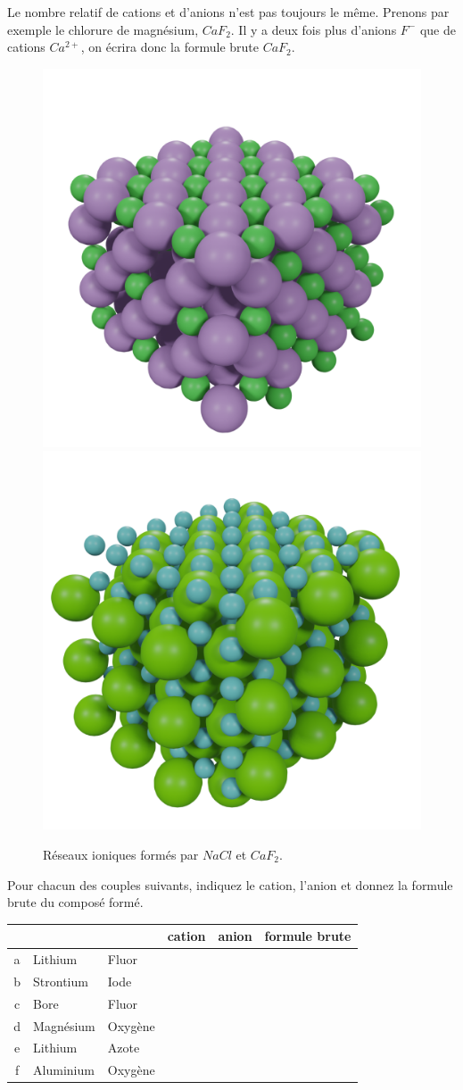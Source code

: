 \documentclass[
  11pt,
  a4paper,
  openany]{book}
\begin{document}
Le nombre relatif de cations et d'anions n'est pas toujours le même. Prenons par exemple le chlorure de magnésium, \(CaF_2\). Il y a deux fois plus d'anions \(F^-\) que de cations \(Ca^{2+}\), on écrira donc la formule brute \(CaF_2\).

\begin{figure}

{\centering \includegraphics[width=0.25\linewidth]{images/NaCl-crystal} \includegraphics[width=0.25\linewidth]{images/CaF2-crystal} 

}

\caption{Réseaux ioniques formés par $NaCl$ et $CaF_2$.}\label{fig:NaClCaF2}
\end{figure}

\begin{Exercise}
Pour chacun des couples suivants, indiquez le cation, l'anion et donnez la formule brute du composé formé.

\end{Exercise}

\begin{longtable}[]{@{}cllccc@{}}
\toprule\noalign{}
~ & ~ & ~ & cation & anion & formule brute \\
\midrule\noalign{}
\endhead
\bottomrule\noalign{}
\endlastfoot
a & Lithium & Fluor & & & \\
b & Strontium & Iode & & & \\
c & Bore & Fluor & & & \\
d & Magnésium & Oxygène & & & \\
e & Lithium & Azote & & & \\
f & Aluminium & Oxygène & & & \\
\end{longtable}
\end{document}
